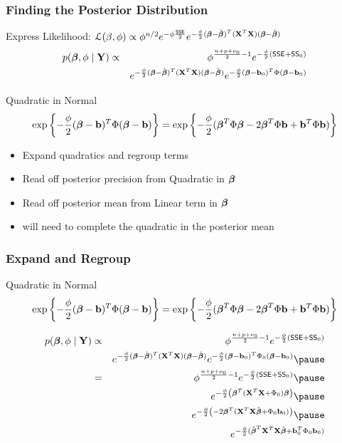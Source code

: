 \documentclass[]{beamer}
\begin{document}
\begin{frame}
\frametitle{Finding the Posterior Distribution}
Express Likelihood: ${\cal{L}}(\beta, \phi) \propto \phi^{n/2} e^{- \phi \frac{\textsf{SSE}}{2}}
e^{-\frac{\phi}{2} (\boldsymbol{\beta} - \hat{\boldsymbol{\beta}})^T(\mathbf{X}^T\mathbf{X}) (\boldsymbol{\beta} - \hat{\boldsymbol{\beta}})}$ \pause
\begin{eqnarray*}
 p(\boldsymbol{\beta}, \phi \mid \mathbf{Y}) &\propto&  \phi^{\frac {n + p + \nu_0}{ 2} - 1}
 e^{- \frac \phi 2 ( \textsf{SSE} + \textsf{SS}_0) } \\
 & & e^{-\frac{\phi}{2} (\boldsymbol{\beta} - \hat{\boldsymbol{\beta}})^T(\mathbf{X}^T\mathbf{X}) (\boldsymbol{\beta} - \hat{\boldsymbol{\beta}})}
 e^{- \frac{\phi}{2} (\boldsymbol{\beta} - \mathbf{b}_0)^T \Phi (\boldsymbol{\beta} - \mathbf{b}_0) }  
\end{eqnarray*} \pause

Quadratic in Normal
$$\exp\left\{- \frac{\phi}{2} (\boldsymbol{\beta} - \mathbf{b})^T \Phi (\boldsymbol{\beta} - \mathbf{b}) \right\} = \exp\left\{-
  \frac{\phi}{2} (\boldsymbol{\beta}^T \Phi \boldsymbol{\beta} - 2 \boldsymbol{\beta}^T \Phi \mathbf{b} + \mathbf{b}^T\Phi \mathbf{b} )\right\}$$
\pause

  \begin{itemize}
  \item Expand quadratics and regroup terms \pause 
  \item Read off posterior precision from Quadratic in $\boldsymbol{\beta}$ \pause 
  \item Read off posterior mean from Linear term in $\boldsymbol{\beta}$ \pause 
  \item will need to complete the quadratic in the posterior mean
  \end{itemize}
\end{frame}
\begin{frame}
  \frametitle{ Expand and Regroup}
  Quadratic in Normal
$$\exp\left\{- \frac{\phi}{2} (\boldsymbol{\beta} - \mathbf{b})^T \Phi (\boldsymbol{\beta} - \mathbf{b}) \right\} = \exp\left\{-
  \frac{\phi}{2} (\boldsymbol{\beta}^T \Phi \boldsymbol{\beta} - 2 \boldsymbol{\beta}^T \Phi \mathbf{b} + \mathbf{b}^T\Phi \mathbf{b} )\right\}$$
\pause 

\begin{eqnarray*}
 p(\b, \phi \mid \Y) &\propto&  \phi^{\frac {n + p + \nu_0}{ 2} - 1}
 e^{- \frac \phi 2 ( \SSE + \SS_0) }  \\
 & & e^{-\frac{\phi}{2} (\b - \bhat)^T(\X^T\X) (\b - \bhat)}
 e^{- \frac{\phi}{2} (\b - \bv_0)^T \Phi_0 (\b - \bv_0) } \pause  \\ 
 & = & \phi^{\frac {n + p + \nu_0}{ 2} - 1}
 e^{- \frac \phi 2 ( \SSE + \SS_0) } \pause \\
& &  e^{ -\frac{\phi}{2} \left(  \b^T (\X^T\X + \Phi_0) \b  \right) } \pause \\
& &  e^{  -\frac{\phi}{2} \left( -2 \b^T (\X^T\X \bhat  + \Phi_0 \bv_0)
   \right)} \pause \\
& &  e^{  -\frac{\phi}{2} (\bhat^T \X^T\X \bhat + \bv_0^T \Phi_0 \bv_0
  )}
\end{eqnarray*}




\end{frame}
\end{document}
